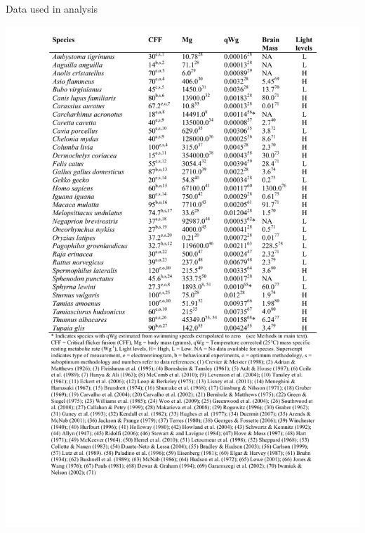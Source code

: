 \begin{table}[h!]
  \caption[Table 1.]{Data used in analysis}
  \label{tbl:Table 1.}
  \includegraphics[width=\linewidth]{ch2-time/Table_1}
\end{table}


